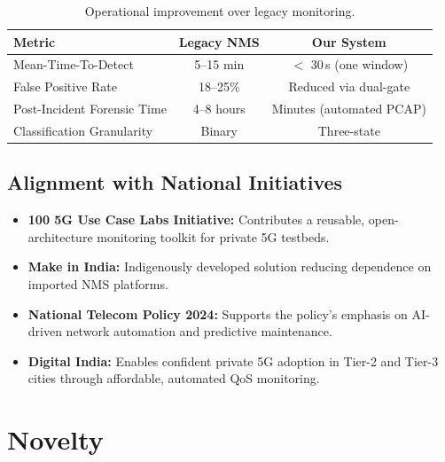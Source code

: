 \documentclass[11pt, a4paper]{article}
\begin{document}
\begin{table}[H]
\centering
\begin{tabular}{l c c}
\toprule
\textbf{Metric} & \textbf{Legacy NMS} & \textbf{Our System} \\
\midrule
Mean-Time-To-Detect           & 5--15 min       & $<$ 30\,s (one window) \\
False Positive Rate            & 18--25\%        & Reduced via dual-gate \\
Post-Incident Forensic Time    & 4--8 hours      & Minutes (automated PCAP) \\
Classification Granularity     & Binary          & Three-state \\
\bottomrule
\end{tabular}
\caption{Operational improvement over legacy monitoring.}
\label{tab:impact}
\end{table}

\subsection{Alignment with National Initiatives}

\begin{itemize}
    \item \textbf{100 5G Use Case Labs Initiative:} Contributes a reusable, open-architecture monitoring toolkit for private 5G testbeds.
    \item \textbf{Make in India:} Indigenously developed solution reducing dependence on imported NMS platforms.
    \item \textbf{National Telecom Policy 2024:} Supports the policy's emphasis on AI-driven network automation and predictive maintenance.
    \item \textbf{Digital India:} Enables confident private 5G adoption in Tier-2 and Tier-3 cities through affordable, automated QoS monitoring.
\end{itemize}

\section{Novelty}
\end{document}
